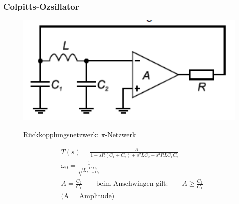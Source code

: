 \subsubsection{Colpitts-Ozsillator}
\begin{figure}[h!]
	\begin{minipage}{0.3\textwidth} 
	\includegraphics[width=1.1\textwidth]{images/Colpitts-Oszillator}
	\end{minipage}
	\begin{minipage}{0.6\textwidth}
      \begin{compactitem}
        \item Rückkopplungsnetzwerk: $\pi$-Netzwerk\\
      \end{compactitem}
      \begin{equation*} 
        \begin{split} 
           &T(s) = \frac{-A}{1+sR(C_1+C_2)+s^2LC_2+s^3RLC_1C_2}\\
           &\omega _0 = \frac{1}{\sqrt{L\frac{C_1 C_2}{C_1+C_2}}}\\
           &A =\frac{C_2}{C_1} \quad \quad \text{beim Anschwingen gilt:} \quad \quad A \geq\frac{C_2}{C_1} \\
           &\text{(A = Amplitude)} \\
        \end{split} 
      \end{equation*}
	\end{minipage}
\end{figure}

\FloatBarrier
